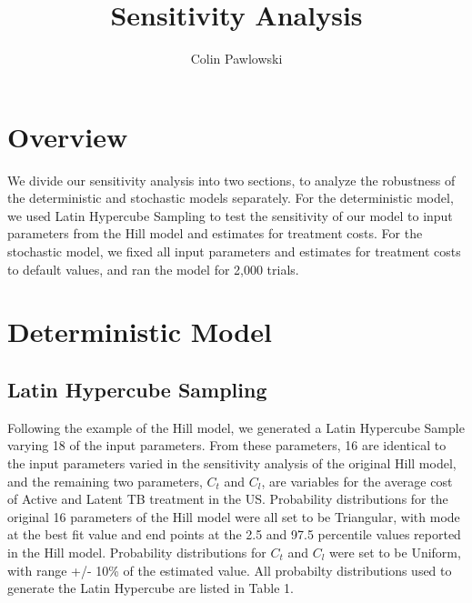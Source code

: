 \documentclass{article}[11pt]
\begin{document}
\title{Sensitivity Analysis}
\author{Colin Pawlowski}
\date{}
\maketitle


\section{Overview}
We divide our sensitivity analysis into two sections, to analyze the robustness of the deterministic and stochastic models separately.  For the deterministic model, we used Latin Hypercube Sampling to test the sensitivity of our model to input parameters from the Hill model and estimates for treatment costs.  
For the stochastic model, we fixed all input parameters and estimates for treatment costs to default values, and ran the model for 2,000 trials.  

\section{Deterministic Model}
\subsection{Latin Hypercube Sampling}
Following the example of the Hill model, we generated a Latin Hypercube Sample varying 18 of the input parameters.  From these parameters, 16 are identical to the input parameters varied in the sensitivity analysis of the original Hill model, and the remaining two parameters, $C_{t}$ and $C_{l}$, are variables for the average cost of Active and Latent TB treatment in the US.  Probability distributions for the original 16 parameters of the Hill model were all set to be Triangular, with mode at the best fit value and end points at the 2.5 and 97.5 percentile values reported in the Hill model.  Probability distributions for $C_{t}$ and $C_{l}$ were set to be Uniform, with range +/- 10\% of the estimated value.  All probabilty distributions used to generate the Latin Hypercube are listed in Table 1.\\
\end{document}
